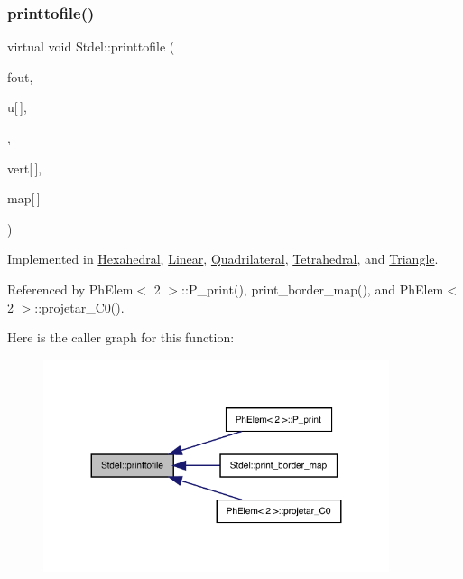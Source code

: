 \subsubsection{\texorpdfstring{printtofile()}{printtofile()}\hspace{0.1cm}{\footnotesize\ttfamily [1/2]}}
{\footnotesize\ttfamily virtual void Stdel\+::printtofile (\begin{DoxyParamCaption}\item[{F\+I\+LE $\ast$}]{fout,  }\item[{const double}]{u\mbox{[}$\,$\mbox{]},  }\item[{double($\ast$)(double, double, double)}]{,  }\item[{const \hyperlink{structVertice}{Vertice}}]{vert\mbox{[}$\,$\mbox{]},  }\item[{const int}]{map\mbox{[}$\,$\mbox{]} }\end{DoxyParamCaption})\hspace{0.3cm}{\ttfamily [pure virtual]}}



Implemented in \hyperlink{classHexahedral_a062fb995d31193f800fbf12ff7f19571}{Hexahedral}, \hyperlink{classLinear_a6d58a6496896386af09591187d08ab73}{Linear}, \hyperlink{classQuadrilateral_af2a943c2b5b073fde641ce93b70f95b4}{Quadrilateral}, \hyperlink{classTetrahedral_a1ebce59e415a8c8fa52b453439fc06ee}{Tetrahedral}, and \hyperlink{classTriangle_a404774b49104b12d072c9c103f9c357c}{Triangle}.



Referenced by Ph\+Elem$<$ 2 $>$\+::\+P\+\_\+print(), print\+\_\+border\+\_\+map(), and Ph\+Elem$<$ 2 $>$\+::projetar\+\_\+\+C0().

Here is the caller graph for this function\+:
\nopagebreak
\begin{figure}[H]
\begin{center}
\leavevmode
\includegraphics[width=287pt]{classStdel_a315869f4c1fe1fdf4911c0d4ab092176_icgraph}
\end{center}
\end{figure}
\mbox{\label{classStdel_a6863f8aeb8e4fb01299b109b0dd3fe13}} 
